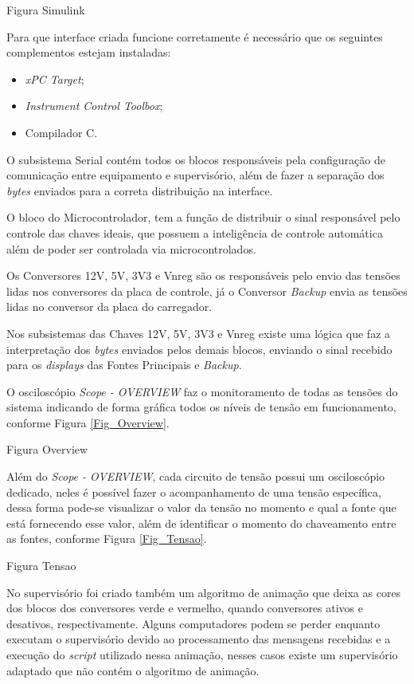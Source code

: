 \documentclass[
	12pt,				%
	openright,			%
	oneside,			%
	a4paper,			%
	english,			%
	french,				%
	spanish,			%
	brazil,				%
	oldfontcommands
	]{abntex2}
\begin{document}
	Figura Simulink
	
	Para que interface criada funcione corretamente é necessário que os seguintes complementos estejam instaladas:
	
	\begin{itemize}
	\item \textit{xPC Target};
	\item \textit{Instrument Control Toolbox};
	\item Compilador C.
	\end{itemize}

	O subsistema Serial contém todos os blocos responsáveis pela configuração de comunicação entre equipamento e supervisório, além de fazer a separação dos \textit{bytes} enviados para a correta distribuição na interface.
	
	O bloco do Microcontrolador, tem a função de distribuir o sinal responsável pelo controle das chaves ideais, que possuem a inteligência de controle automática além de poder ser controlada via microcontrolados.
	
	Os Conversores 12V, 5V, 3V3 e Vnreg são os responsáveis pelo envio das tensões lidas nos conversores da placa de controle, já o Conversor \textit{Backup} envia as tensões lidas no conversor da placa do carregador.
	
	Nos subsistemas das Chaves 12V, 5V, 3V3 e Vnreg existe uma lógica que faz a interpretação dos \textit{bytes} enviados pelos demais blocos, enviando o sinal recebido para os \textit{displays} das Fontes Principais e \textit{Backup}.
	
	O osciloscópio \textit{Scope - OVERVIEW} faz o monitoramento de todas as tensões do sistema indicando de forma gráfica todos os níveis de tensão em funcionamento, conforme Figura \ref{Fig_Overview}.
	
	Figura Overview
	
	Além do \textit{Scope - OVERVIEW}, cada circuito de tensão possui um osciloscópio dedicado, neles é possível fazer o acompanhamento de uma tensão específica, dessa forma pode-se visualizar o valor da tensão no momento e qual a fonte que está fornecendo esse valor, além de identificar o momento do chaveamento entre as fontes, conforme Figura \ref{Fig_Tensao}.
	
	Figura Tensao
	
	No supervisório foi criado também um algoritmo de animação que deixa as cores dos blocos dos conversores verde e vermelho, quando conversores ativos e desativos, respectivamente. Alguns computadores podem se perder enquanto executam o supervisório devido ao processamento das mensagens recebidas e a execução do \textit{script} utilizado nessa animação, nesses casos existe um supervisório adaptado que não contém o algoritmo de animação. 
\end{document}
